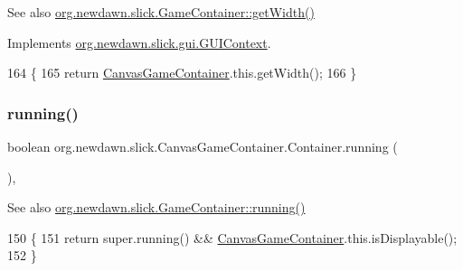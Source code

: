 \begin{DoxySeeAlso}{See also}
\mbox{\hyperlink{classorg_1_1newdawn_1_1slick_1_1_game_container_a938fe1a28567182445e60450915d5f69}{org.\+newdawn.\+slick.\+Game\+Container\+::get\+Width()}} 
\end{DoxySeeAlso}


Implements \mbox{\hyperlink{interfaceorg_1_1newdawn_1_1slick_1_1gui_1_1_g_u_i_context_a013e06eaddd0d6872dc628ca171c6753}{org.\+newdawn.\+slick.\+gui.\+G\+U\+I\+Context}}.


\begin{DoxyCode}
164                               \{
165             \textcolor{keywordflow}{return} \mbox{\hyperlink{classorg_1_1newdawn_1_1slick_1_1_canvas_game_container_a078feee2c69d77cabd1f09b87d055923}{CanvasGameContainer}}.this.getWidth();
166         \}
\end{DoxyCode}
\mbox{\label{classorg_1_1newdawn_1_1slick_1_1_canvas_game_container_1_1_container_a121236f5afee614695471048aa439611}} 
\subsubsection{\texorpdfstring{running()}{running()}}
{\footnotesize\ttfamily boolean org.\+newdawn.\+slick.\+Canvas\+Game\+Container.\+Container.\+running (\begin{DoxyParamCaption}{ }\end{DoxyParamCaption})\hspace{0.3cm}{\ttfamily [inline]}, {\ttfamily [protected]}}

\begin{DoxySeeAlso}{See also}
\mbox{\hyperlink{classorg_1_1newdawn_1_1slick_1_1_game_container_a5cb10a093281abb5b6ee60f2b18c26c3}{org.\+newdawn.\+slick.\+Game\+Container\+::running()}} 
\end{DoxySeeAlso}

\begin{DoxyCode}
150                                     \{
151             \textcolor{keywordflow}{return} super.running() && \mbox{\hyperlink{classorg_1_1newdawn_1_1slick_1_1_canvas_game_container_a078feee2c69d77cabd1f09b87d055923}{CanvasGameContainer}}.this.isDisplayable();
152         \}
\end{DoxyCode}
\mbox{\label{classorg_1_1newdawn_1_1slick_1_1_canvas_game_container_1_1_container_a2f517d5a251e77f9f6f8d3ee6a7c89c1}} 
